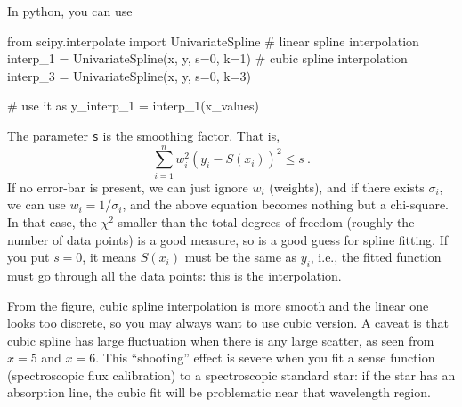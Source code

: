 In python, you can use
\begin{python}
from scipy.interpolate import UnivariateSpline
# linear spline interpolation
interp_1 = UnivariateSpline(x, y, s=0, k=1)
# cubic spline interpolation
interp_3 = UnivariateSpline(x, y, s=0, k=3)

# use it as y_interp_1 = interp_1(x_values)
\end{python}
The parameter \texttt{s} is the smoothing factor. That is, 
\begin{equation}
  \sum_{i=1}^{n} w_i^2 (y_i - S(x_i))^2 \le s ~.
\end{equation}
If no error-bar is present, we can just ignore $ w_i $ (weights), and if there exists $ \sigma_i $, we can use $ w_i = 1/\sigma_i $, and the above equation becomes nothing but a chi-square. In that case, the $ \chi^2 $ smaller than the total degrees of freedom (roughly the number of data points) is a good measure, so  is a good guess for spline fitting. If you put $ s = 0 $, it means $ S(x_i) $ must be the same as $ y_i $, i.e., the fitted function must go through all the data points: this is the interpolation. 

From the figure, cubic spline interpolation is more smooth and the linear one looks too discrete, so you may always want to use cubic version. A caveat is that cubic spline has large fluctuation when there is any large scatter, as seen from $ x = 5 $ and $ x = 6 $. This ``shooting'' effect is severe when you fit a sense function (spectroscopic flux calibration) to a spectroscopic standard star: if the star has an absorption line, the cubic fit will be problematic near that wavelength region. 


